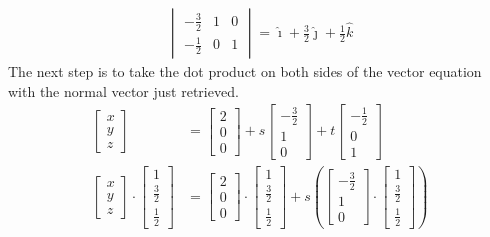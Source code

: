 \begin{solution}
\begin{align*}
\begin{vmatrix}
-\frac{3}{2} & 1 & 0 \\
-\frac{1}{2} & 0 & 1
\end{vmatrix}
= \hat{\imath} + \frac{3}{2}\hat{\jmath} + \frac{1}{2}\hat{k}
\end{align*}
The next step is to take the dot product on both sides of the vector equation with the normal vector just retrieved.
\begin{align*}
\begin{bmatrix}
x \\
y \\
z
\end{bmatrix}
&=
\begin{bmatrix}
2 \\
0 \\
0
\end{bmatrix}
+ s
\begin{bmatrix}
-\frac{3}{2} \\
1 \\
0
\end{bmatrix}
+ t
\begin{bmatrix}
-\frac{1}{2} \\
0 \\
1
\end{bmatrix} \\
\begin{bmatrix}
x \\
y \\
z
\end{bmatrix}
\cdot
\begin{bmatrix}
1 \\
\frac{3}{2} \\
\frac{1}{2}
\end{bmatrix}
&=
\begin{bmatrix}
2 \\
0 \\
0
\end{bmatrix}
\cdot
\begin{bmatrix}
1 \\
\frac{3}{2} \\
\frac{1}{2}
\end{bmatrix}
+ s
\left(\begin{bmatrix}
-\frac{3}{2} \\
1 \\
0
\end{bmatrix}
\cdot
\begin{bmatrix}
1 \\
\frac{3}{2} \\
\frac{1}{2}
\end{bmatrix}\right)

\end{align*}
\end{solution}
